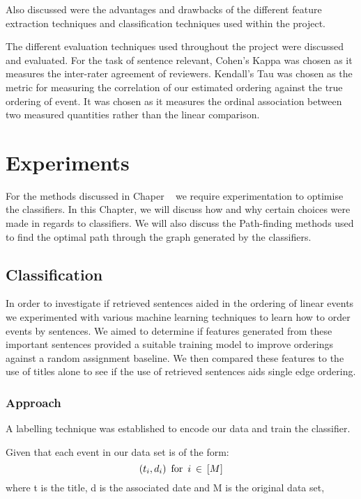 \documentclass[bsc,frontabs,twoside,singlespacing,parskip,deptreport]{infthesis}     %
\begin{document}
Also discussed were the advantages and  drawbacks of the different feature extraction techniques and classification
techniques used within the project.

The different evaluation techniques used throughout the project were discussed and evaluated. 
For the task of sentence relevant, Cohen's Kappa \cite{wood2007understanding} was chosen as it measures the inter-rater agreement of
reviewers. Kendall's Tau \cite{abdi2007kendall} was chosen as the metric for measuring the correlation of our estimated ordering
against the true ordering of event. It was chosen as it measures the ordinal association between two
measured quantities rather than the linear comparison.


\chapter{Experiments}
For the methods discussed in Chaper ~\cite{chapter:methodology} we require experimentation to optimise the classifiers.
In this Chapter, we will discuss how and why certain choices were made in regards to classifiers.
We will also discuss the Path-finding methods used to find the optimal path through the graph generated by the
classifiers.

\section{Classification}
In order to investigate if retrieved sentences aided in the  ordering of linear events we experimented with various
machine learning techniques to learn how to order events by sentences.
We aimed to determine if features generated from these important sentences provided a suitable training model
to improve orderings against a random assignment baseline. We then compared these features to the use of titles alone
to see if the use of retrieved sentences aids single edge ordering.


\subsection{Approach}\label{sec:approach}
A labelling technique was established to encode our data and train the classifier.

Given that each event in our data set is of the form:
\begin{equation}
  (t_{i},d_{i}) \hspace{0.5em} \text{for} \hspace{0.5em} i \hspace{0.2em}\in \hspace{0.2em} [M]\nonumber
    \end{equation}
    where t is the title, d is the associated date and M is the original data set,
\end{document}

